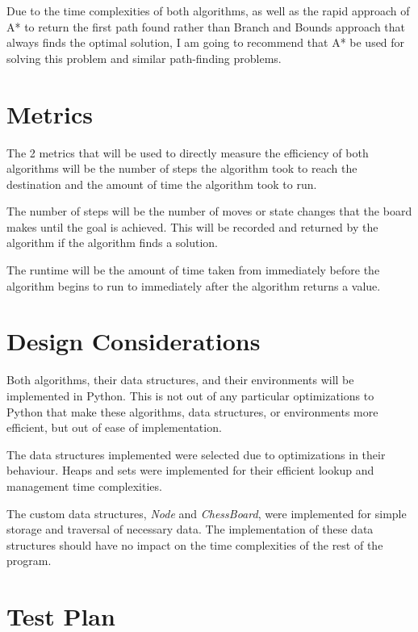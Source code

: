 \documentclass[12pt, letterpaper, final, onecolumn, titlepage] {article}
\begin{document}
\noindent Due to the time complexities of both algorithms, as well as the rapid approach of A* to return the first path found rather than Branch and Bounds approach that always finds the optimal solution, I am going to recommend that A* be used for solving this problem and similar path-finding problems.

\newpage

\section{Metrics}

\noindent The 2 metrics that will be used to directly measure the efficiency of both algorithms will be the number of steps the algorithm took to reach the destination and the amount of time the algorithm took to run.

\noindent The number of steps will be the number of moves or state changes that the board makes until the goal is achieved.  This will be recorded and returned by the algorithm if the algorithm finds a solution.

\noindent The runtime will be the amount of time taken from immediately before the algorithm begins to run to immediately after the algorithm returns a value.

\newpage

\section{Design Considerations}

\noindent Both algorithms, their data structures, and their environments will be implemented in Python. This is not out of any particular optimizations to Python that make these algorithms, data structures, or environments more efficient, but out of ease of implementation.

\noindent The data structures implemented were selected due to optimizations in their behaviour.  Heaps and sets were implemented for their efficient lookup and management time complexities.

\noindent The custom data structures, \textit{Node} and \textit{ChessBoard}, were implemented for simple storage and traversal of necessary data.  The implementation of these data structures should have no impact on the time complexities of the rest of the program.

\newpage

\section{Test Plan}
\end{document}
